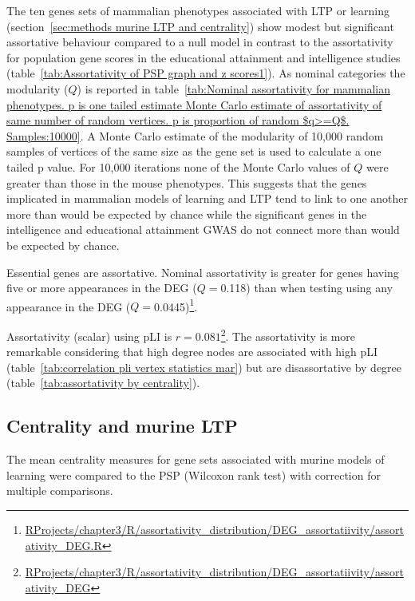     The ten genes sets of mammalian phenotypes associated with LTP or learning (section~\ref{sec:methods murine LTP and centrality}) show modest but significant assortative behaviour compared to a null model in contrast to the assortativity for population gene scores in the educational attainment and intelligence studies (table~\ref{tab:Assortativity of PSP graph and z scores1}). As nominal categories the modularity ($Q$) is reported in table~\ref{tab:Nominal assortativity for mammalian phenotypes. p is one tailed estimate Monte Carlo estimate of assortativity of same number of random vertices. p is proportion of random $q>=Q$. Samples:10000}. A Monte Carlo estimate of the modularity of 10,000 random samples of vertices of the same size as the gene set is used to calculate a one tailed p value. For 10,000 iterations none of the Monte Carlo values of $Q$ were greater than those in the mouse phenotypes. This suggests that the genes implicated in mammalian models of learning and LTP tend to link to one another more than would be expected by chance while the significant genes in the intelligence and educational attainment GWAS do not connect more than would be expected by chance. 
 
 Essential genes are assortative. Nominal assortativity is greater for genes having five or more appearances in the DEG ($Q=$0.118) than when testing using any appearance in the DEG ($Q=$0.0445)\footnote{\url{RProjects/chapter3/R/assortativity_distribution/DEG_assortatiivity/assortativity_DEG.R}}.
 
 Assortativity (scalar) using pLI is $r=0.081$\footnote{\url{RProjects/chapter3/R/assortativity_distribution/DEG_assortatiivity/assortativity_DEG}}. The assortativity is more remarkable considering that high degree nodes are associated with high pLI (table~\ref{tab:correlation pli vertex statistics mar}) but are disassortative by degree (table~\ref{tab:assortativity by centrality}).

 
 
 \clearpage
 
 
\subsection{Centrality and murine LTP}
\label{sec:Centrality and murine LTP}
The mean centrality measures for gene sets associated with murine models of learning were compared to the PSP (Wilcoxon rank test) with correction for multiple comparisons. 

